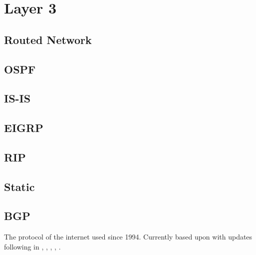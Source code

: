 \chapter{Layer 3}

\section{Routed Network}

\section{OSPF}
\section{IS-IS}
\section{EIGRP}
\section{RIP}
\section{Static}

\newpage

\section{BGP}


The protocol of the internet used since 1994.\cite{wiki:Border_Gateway_Protocol}
Currently based upon  with updates following in  , , , , .

